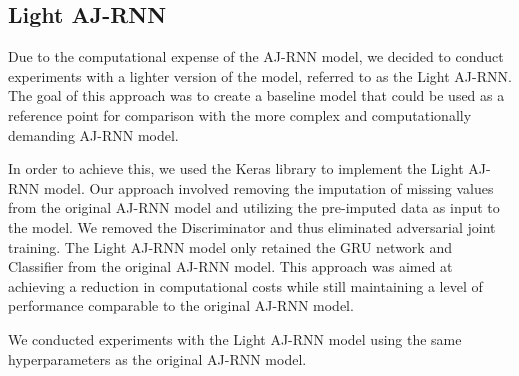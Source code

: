 \pagebreak
\subsection{Light AJ-RNN}

Due to the computational expense of the AJ-RNN model, we decided to conduct experiments with a lighter version of the model, referred to as the Light AJ-RNN.
The goal of this approach was to create a baseline model that could be used as a reference point for comparison with the more complex and computationally demanding AJ-RNN model. 

In order to achieve this, we used the Keras library to implement the Light AJ-RNN model.
Our approach involved removing the imputation of missing values from the original AJ-RNN model and utilizing the pre-imputed data as input to the model.
We removed the Discriminator and thus eliminated adversarial joint training.
The Light AJ-RNN model only retained the GRU network and Classifier from the original AJ-RNN model.
This approach was aimed at achieving a reduction in computational costs while still maintaining a level of performance comparable to the original AJ-RNN model.

We conducted experiments with the Light AJ-RNN model using the same hyperparameters as the original AJ-RNN model.


